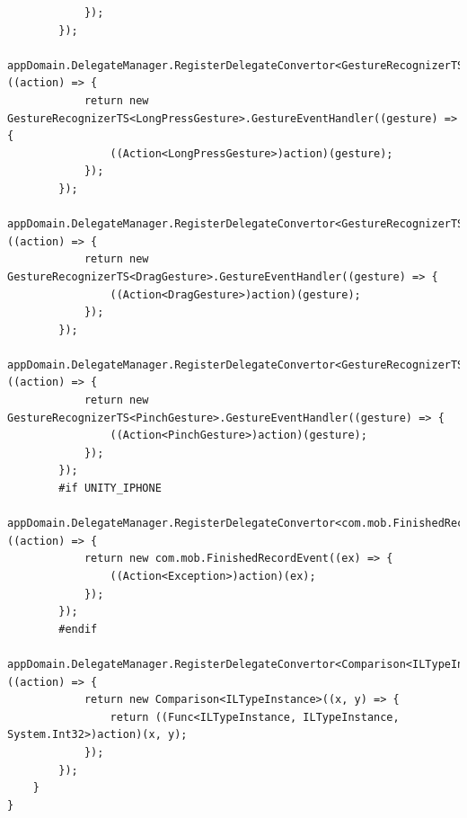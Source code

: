 \documentclass[9pt, b5paper]{article}
\begin{document}
\begin{verbatim}
            });
        });
        appDomain.DelegateManager.RegisterDelegateConvertor<GestureRecognizerTS<LongPressGesture>.GestureEventHandler>((action) => {
            return new GestureRecognizerTS<LongPressGesture>.GestureEventHandler((gesture) => {
                ((Action<LongPressGesture>)action)(gesture);
            });
        });
        appDomain.DelegateManager.RegisterDelegateConvertor<GestureRecognizerTS<DragGesture>.GestureEventHandler>((action) => {
            return new GestureRecognizerTS<DragGesture>.GestureEventHandler((gesture) => {
                ((Action<DragGesture>)action)(gesture);
            });
        });
        appDomain.DelegateManager.RegisterDelegateConvertor<GestureRecognizerTS<PinchGesture>.GestureEventHandler>((action) => {
            return new GestureRecognizerTS<PinchGesture>.GestureEventHandler((gesture) => {
                ((Action<PinchGesture>)action)(gesture);
            });
        });
        #if UNITY_IPHONE
                appDomain.DelegateManager.RegisterDelegateConvertor<com.mob.FinishedRecordEvent>((action) => {
            return new com.mob.FinishedRecordEvent((ex) => {
                ((Action<Exception>)action)(ex);
            });
        });
        #endif
        appDomain.DelegateManager.RegisterDelegateConvertor<Comparison<ILTypeInstance>>((action) => {
            return new Comparison<ILTypeInstance>((x, y) => {
                return ((Func<ILTypeInstance, ILTypeInstance, System.Int32>)action)(x, y);
            });
        });
    }
}
\end{verbatim}
\end{document}
